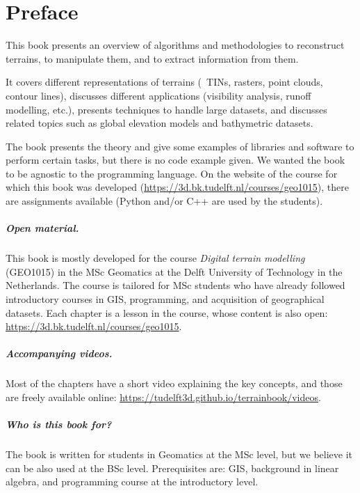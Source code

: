 


\chapter*{Preface}

This book presents an overview of algorithms and methodologies to reconstruct terrains, to manipulate them, and to extract information from them.

It covers different representations of terrains (\eg\ TINs, rasters, point clouds, contour lines), discusses different applications (visibility analysis, runoff modelling, etc.), presents techniques to handle large datasets, and discusses related topics such as global elevation models and bathymetric datasets.

The book presents the theory and give some examples of libraries and software to perform certain tasks, but there is no code example given.
We wanted the book to be agnostic to the programming language.
On the website of the course for which this book was developed (\url{https://3d.bk.tudelft.nl/courses/geo1015}), there are assignments available (Python and/or C++ are used by the students).


\paragraph*{Open material.}
This book is mostly developed for the course \emph{Digital terrain modelling} (GEO1015) in the MSc Geomatics at the Delft University of Technology in the Netherlands.
The course is tailored for MSc students who have already followed  introductory courses in GIS, programming, and acquisition of geographical datasets.
Each chapter is a lesson in the course, whose content is also open: \url{https://3d.bk.tudelft.nl/courses/geo1015}.


\paragraph*{Accompanying videos.}
Most of the chapters have a short video explaining the key concepts, and those are freely available online: \url{https://tudelft3d.github.io/terrainbook/videos}.


\paragraph*{Who is this book for?}
The book is written for students in Geomatics at the MSc level, but we believe it can be also used at the BSc level.
Prerequisites are: GIS, background in linear algebra, and programming course at the introductory level.


